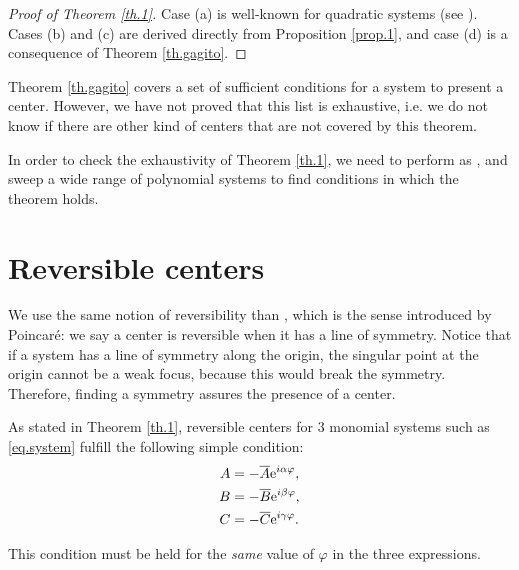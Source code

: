 \begin{proof}[Proof of Theorem \ref{th.1}]
Case (a) is well-known for quadratic systems (see \textcite{Zoladek1994}). Cases (b) and (c) are derived directly from Proposition \ref{prop.1}, and case (d) is a consequence of Theorem \ref{th.gagito}. 
\end{proof}



\begin{observacio}
Theorem \ref{th.gagito} covers a set of sufficient conditions for a system to present a center. However, we have not proved that this list is exhaustive, i.e. we do not know if there are other kind of centers that are not covered by this theorem.
\end{observacio}

In order to check the exhaustivity of Theorem \ref{th.1}, we need to perform as \textcite{Gasull2016}, and sweep a wide range of polynomial systems to find conditions in which the theorem holds.






\section{Reversible centers}
\label{sec.reversible}

We use the same notion of reversibility than \textcite{Gasull2016}, which is the sense introduced by Poincaré: we say a center is reversible when it has a line of symmetry. Notice that if a system has a line of symmetry along the origin, the singular point at the origin cannot be a weak focus, because this would break the symmetry. Therefore, finding a symmetry assures the presence of a center.

As stated in Theorem \ref{th.1}, reversible centers for 3 monomial systems such as \eqref{eq.system} fulfill the following simple condition:
\begin{align}
A &= -\overline A\mathrm{e}^{i \alpha \varphi},\label{eq.rev.1}\\
B &= -\overline B\mathrm{e}^{i \beta \varphi},\label{eq.rev.2}\\
C &= -\overline C\mathrm{e}^{i \gamma \varphi}.\label{eq.rev.3}
\end{align}

\begin{observacio}
This condition must be held for the \emph{same} value of $\varphi$ in the three expressions.
\end{observacio}

